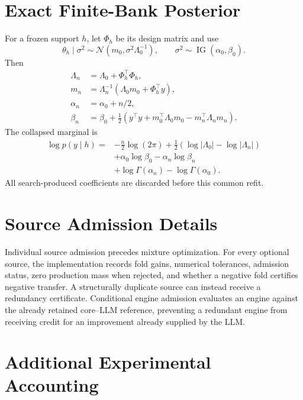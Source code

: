 \documentclass[twoside]{article}
\begin{document}



\clearpage
\appendix

\section{Exact Finite-Bank Posterior}

For a frozen support \(h\), let \(\Phi_h\) be its design matrix and use
\[
\theta_h\mid\sigma^2\sim
\mathcal N(m_0,\sigma^2\Lambda_0^{-1}),\qquad
\sigma^2\sim\operatorname{IG}(\alpha_0,\beta_0).
\]
Then
\[
\begin{aligned}
\Lambda_n&=\Lambda_0+\Phi_h^\top\Phi_h,\\
m_n&=\Lambda_n^{-1}(\Lambda_0m_0+\Phi_h^\top y),\\
\alpha_n&=\alpha_0+n/2,\\
\beta_n&=\beta_0+\tfrac12(y^\top y+m_0^\top\Lambda_0m_0-
m_n^\top\Lambda_nm_n).
\end{aligned}
\]
The collapsed marginal is
\begin{align*}
\log p(y\mid h)
={}&-\frac n2\log(2\pi)
+\frac12(\log|\Lambda_0|-\log|\Lambda_n|)\\
&+\alpha_0\log\beta_0-\alpha_n\log\beta_n\\
&+\log\Gamma(\alpha_n)-\log\Gamma(\alpha_0).
\end{align*}
All search-produced coefficients are discarded before this common refit.

\section{Source Admission Details}

Individual source admission precedes mixture optimization. For every optional
source, the implementation records fold gains, numerical tolerances,
admission status, zero production mass when rejected, and whether a negative
fold certifies negative transfer. A structurally duplicate source can instead
receive a redundancy certificate. Conditional engine admission evaluates an
engine against the already retained core--LLM reference, preventing a
redundant engine from receiving credit for an improvement already supplied by
the LLM.

\section{Additional Experimental Accounting}
\end{document}
